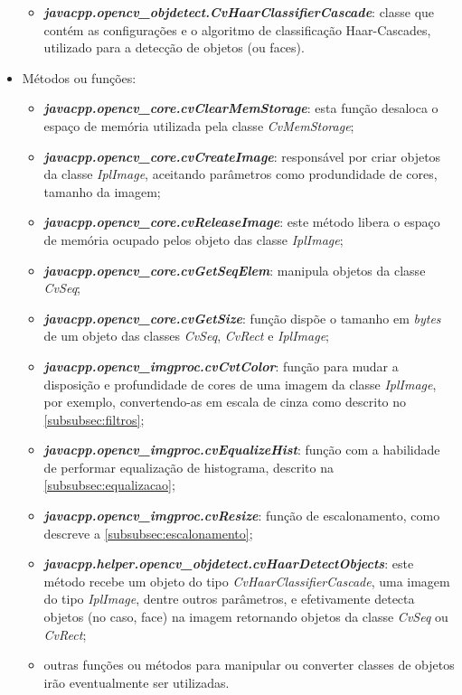 \begin{itemize}
\begin{itemize}
		\item \textbf{\textit{javacpp.opencv\_objdetect.CvHaarClassifierCascade}}: classe que contém as configurações e o algoritmo de classificação Haar-Cascades, utilizado para a detecção de objetos (ou faces).
	\end{itemize}

	\item Métodos ou funções:
	\begin{itemize}		
		\item \textbf{\textit{javacpp.opencv\_core.cvClearMemStorage}}: esta função desaloca o espaço de memória utilizada pela classe \textit{CvMemStorage};
		
		\item \textbf{\textit{javacpp.opencv\_core.cvCreateImage}}: responsável por criar objetos da classe \textit{IplImage}, aceitando parâmetros como produndidade de cores, tamanho da imagem;
		
		\item \textbf{\textit{javacpp.opencv\_core.cvReleaseImage}}: este método libera o espaço de memória ocupado pelos objeto das classe \textit{IplImage};

		\item \textbf{\textit{javacpp.opencv\_core.cvGetSeqElem}}: manipula objetos da classe \textit{CvSeq};
		
		\item \textbf{\textit{javacpp.opencv\_core.cvGetSize}}: função dispõe o tamanho em \textit{bytes} de um objeto das classes \textit{CvSeq}, \textit{CvRect} e \textit{IplImage};		
		
		\item \textbf{\textit{javacpp.opencv\_imgproc.cvCvtColor}}: função para mudar a disposição e profundidade de cores de uma imagem da classe \textit{IplImage}, por exemplo, convertendo-as em escala de cinza como descrito no \autoref{subsubsec:filtros};
		
		\item \textbf{\textit{javacpp.opencv\_imgproc.cvEqualizeHist}}: função com a habilidade de performar equalização de histograma, descrito na \autoref{subsubsec:equalizacao};
		
		\item \textbf{\textit{javacpp.opencv\_imgproc.cvResize}}: função de escalonamento, como descreve a \autoref{subsubsec:escalonamento};

		\item \textbf{\textit{javacpp.helper.opencv\_objdetect.cvHaarDetectObjects}}: este método recebe um objeto do tipo \textit{CvHaarClassifierCascade}, uma imagem do tipo \textit{IplImage}, dentre outros parâmetros, e efetivamente detecta objetos (no caso, face) na imagem retornando objetos da classe \textit{CvSeq} ou \textit{CvRect};
		
		\item outras funções ou métodos para manipular ou converter classes de objetos irão eventualmente ser utilizadas.
	\end{itemize}	
\end{itemize}

